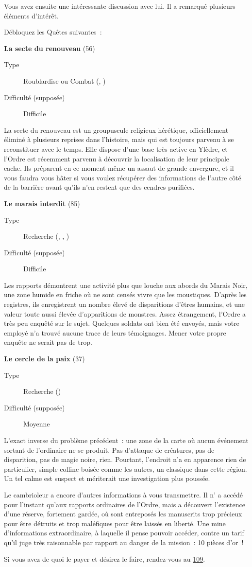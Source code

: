 \documentclass{report}
\newcommand{\glink}[1]{\hyperref[section-#1]{#1}}
\newcommand{\quest}[5]{
    \begin{mdframed}[innertopmargin=0.5cm,innerbottommargin=0.5cm,leftmargin=0.5cm,rightmargin=0.5cm]
        \begin{center}
            \textbf{#1} (#2)
        \end{center}
        \begin{description}
            \item[Type] #3
            \item[Difficulté (supposée)] #4
        \end{description}
        #5
    \end{mdframed}
}
\begin{document}
Vous avez ensuite une intéressante discussion avec lui. Il a remarqué plusieurs éléments d'intérêt.

Débloquez les Quêtes suivantes :

\quest{La secte du renouveau}{56}{Roublardise ou Combat (\ankh, \cross)}{Difficile}{
La secte du renouveau est un groupuscule religieux hérétique, officiellement éliminé à plusieurs reprises dans l'histoire, mais qui est toujours parvenu à se reconstituer avec le temps. Elle dispose d'une base très active en Ylèdre, et l'Ordre est récemment parvenu à découvrir la localisation de leur principale cache. Ils préparent en ce moment-même un assaut de grande envergure, et il vous faudra vous hâter si vous voulez récupérer des informations de l'autre côté de la barrière avant qu'ils n'en restent que des cendres purifiées.
}

\quest{Le marais interdit}{85}{Recherche (\ankh, \caduceus, \cross)}{Difficile}{
Les rapports démontrent une activité plus que louche aux abords du Marais Noir, une zone humide en friche où ne sont censés vivre que les moustiques. D'après les registres, ils enregistrent un nombre élevé de disparitions d'êtres humains, et une valeur toute aussi élevée d'apparitions de monstres. Assez étrangement, l'Ordre a très peu enquêté sur le sujet. Quelques soldats ont bien été envoyés, mais votre employé n'a trouvé aucune trace de leurs témoignages. Mener votre propre enquête ne serait pas de trop.
}

\quest{Le cercle de la paix}{37}{Recherche (\caduceus)}{Moyenne}{
L'exact inverse du problème précédent : une zone de la carte où aucun événement sortant de l'ordinaire ne se produit. Pas d'attaque de créatures, pas de disparition, pas de magie noire, rien. Pourtant, l'endroit n'a en apparence rien de particulier, simple colline boisée comme les autres, un classique dans cette région. Un tel calme est suspect et mériterait une investigation plus poussée.
}

Le cambrioleur a encore d'autres informations à vous transmettre. Il n' a accédé pour l'instant qu'aux rapports ordinaires de l'Ordre, mais a découvert l'existence d'une réserve, fortement gardée, où sont entreposés les manuscrits trop précieux pour être détruits et trop maléfiques pour être laissés en liberté. Une mine d'informations extraordinaire, à laquelle il pense pouvoir accéder, contre un tarif qu'il juge très raisonnable par rapport au danger de la mission : 10 pièces d'or !

Si vous avez de quoi le payer et désirez le faire, rendez-vous au \glink{109}.
\end{document}
